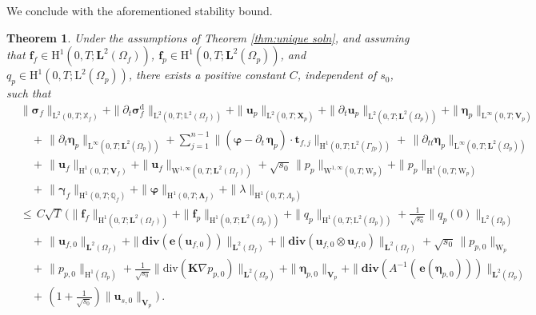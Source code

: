 \documentclass[11pt]{article}
\numberwithin{equation}{section}
\newcommand{\bgamma}{{\boldsymbol\gamma}}
\newcommand{\bLambda}{{\boldsymbol\Lambda}}
\newcommand{\bbeta}{{\boldsymbol\eta}}
\newcommand{\bsi}{{\boldsymbol\sigma}}
\newcommand{\bvarphi}{{\boldsymbol\varphi}}
\newcommand{\f}{\mathbf{f}}
\newcommand{\bu}{\mathbf{u}}
\newcommand{\bt}{{\mathbf{t}}}
\newcommand{\be}{{\mathbf{e}}}
\newcommand{\0}{{\mathbf{0}}}
\def\bK{\mathbf{K}}
\def\bX{\mathbf{X}}
\def\bV{\mathbf{V}}
\newcommand{\bL}{\mathbf{L}}
\newcommand\bbQ{\mathbb{Q}}
\newcommand\bbX{\mathbb{X}}
\newcommand\bbL{\mathbb{L}}
\def\H{\mathrm{H}}
\def\L{\mathrm{L}}
\def\W{\mathrm{W}}
\def\rd{\mathrm{d}}
\def\bdiv{\mathbf{div}}
\def\div{\mathrm{div}}
\newtheorem{thm}{Theorem}[section]
\numberwithin{equation}{section}
\begin{document}
We conclude with the aforementioned stability bound.
%
\begin{thm}\label{thm: continuous stability}
Under the assumptions of Theorem \ref{thm:unique soln}, and assuming that $\f_f \in \H^1(0,T;\bL^2(\Omega_f))$, $\f_p \in \H^1(0,T;\bL^2(\Omega_p))$, and $q_p \in \H^1(0,T;\L^2(\Omega_p))$, 
there exists a positive constant $C$, independent of $s_0$, such that
\begin{align}
&\|\bsi_f\|_{\L^2(0,T;\bbX_f)} 
+ \|\partial_t\bsi^\rd_f\|_{\L^2(0,T;\bbL^2(\Omega_f))} 
+ \|\bu_p\|_{\L^2(0,T;\bX_p)} 
+ \| \partial_t\bu_p\|_{\L^2(0,T;\bL^2(\Omega_p))}
+ \|\bbeta_p\|_{\L^\infty(0,T;\bV_p)} 
\nonumber \\
&\quad +\, \| \partial_t\bbeta_p\|_{\L^\infty(0,T;\bL^2(\Omega_p))}
+ \sum^{n-1}_{j=1} \|(\bvarphi-\partial_t\,\bbeta_p)\cdot\bt_{f,j}\|_{\H^1(0,T;\L^2(\Gamma_{fp}))}
+\, \| \partial_{tt}\bbeta_p\|_{\L^\infty(0,T;\bL^2(\Omega_p))}
\nonumber \\
&\quad +\, \|\bu_f\|_{\H^1(0,T;\bV_f)}
+ \|\bu_f\|_{\W^{1,\infty}(0,T;\bL^2(\Omega_f))}
+ \sqrt{s_0}\,\|p_p\|_{\W^{1,\infty}(0,T;\W_p)}
+ \|p_p\|_{\H^1(0,T;\W_p)}
\nonumber \\[1ex]
&\quad 
+\, \|\bgamma_f\|_{\H^1(0,T;\bbQ_f)} 
+ \|\bvarphi\|_{\H^1(0,T;\bLambda_f)} 
+ \|\lambda\|_{\H^1(0,T;\Lambda_p)} 
\nonumber \\
&\leq\, C \sqrt{T}\,\Bigg( \|\f_f\|_{\H^1(0,T;\bL^2(\Omega_f))}  
+ \|\f_p\|_{\H^1(0,T;\bL^2(\Omega_p))}
+ \|q_p\|_{\H^1(0,T;\L^2(\Omega_p))}
+ \frac{1}{\sqrt{s_0}}\|q_p(0)\|_{\L^2(\Omega_p)}
\nonumber \\
& \quad +\, \|\bu_{f,0}\|_{\bL^2(\Omega_f)}
+ \|\bdiv( \be(\bu_{f,0}))\|_{\bL^{2}(\Omega_f)}
+ \|\bdiv(\bu_{f,0}\otimes \bu_{f,0})\|_{\bL^2(\Omega_f)} 
+ \sqrt{s_0}\,\|p_{p,0}\|_{\W_p}
\nonumber \\
& \quad +\, \|p_{p,0}\|_{\H^1(\Omega_p)}
+ \frac{1}{\sqrt{s_0}}\|\div(\bK\nabla p_{p,0})\|_{\bL^2(\Omega_p)}
+ \|\bbeta_{p,0}\|_{\bV_p} 
+ \|\bdiv(A^{-1}(\, \be(\bbeta_{p,0})))\|_{\bL^2(\Omega_p)} 
\nonumber \\
&\quad 
+\, \left(1+\frac{1}{\sqrt{s_0}}\right)\|\bu_{s,0}\|_{\bV_p}  
\Bigg) \,.
\label{eq:continuous-stability}
\end{align}
\end{thm}
\end{document}
